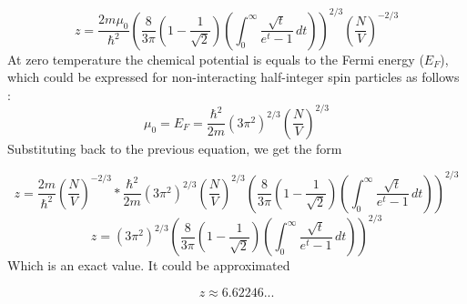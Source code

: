 \begin{equation} \label{eq:23}
z
=
\frac{2m \mu_{0}}{\hbar^{2}}
\left(
\frac{8}{3 \pi} \left( 1 - \frac{1}{\sqrt{2}} \right) \left( \int_{0}^{\infty} \frac{\sqrt{t}}{e^{t} - 1}\,dt \right)
\right)^{2/3}
\left( \frac{N}{V} \right)^{-2/3}
\end{equation}
At zero temperature the chemical potential is equals to the Fermi energy ($E_{F}$), which could be expressed for non-interacting half-integer spin particles as follows \citep{Glyde2014}:
\begin{equation}
\mu_{0}
=
E_{F}
=
\frac{\hbar^{2}}{2m} \left( 3 \pi^{2} \right)^{2/3} \left( \frac{N}{V} \right)^{2/3}
\end{equation}
Substituting back to the previous equation, we get the form

\begin{equation}
z
=
\frac{2m}{\hbar^{2}} \left( \frac{N}{V} \right)^{-2/3} * \frac{\hbar^{2}}{2m} \left( 3 \pi^{2} \right)^{2/3} \left( \frac{N}{V} \right)^{2/3}
\left(
\frac{8}{3 \pi} \left( 1 - \frac{1}{\sqrt{2}} \right) \left( \int_{0}^{\infty} \frac{\sqrt{t}}{e^{t} - 1}\,dt \right)
\right)^{2/3}
\end{equation}
\begin{equation}
z
=
\left( 3 \pi^{2} \right)^{2/3}
\left(
\frac{8}{3 \pi} \left( 1 - \frac{1}{\sqrt{2}} \right) \left( \int_{0}^{\infty} \frac{\sqrt{t}}{e^{t} - 1}\,dt \right)
\right)^{2/3}
\end{equation}
Which is an exact value. It could be approximated

\begin{equation}
z
\approx
6.62246...
\end{equation}